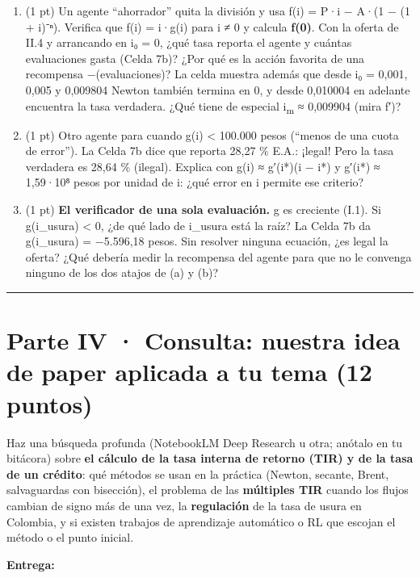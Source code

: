 \begin{enumerate}
\def\labelenumi{\alph{enumi})}
\item
  (1 pt) Un agente ``ahorrador'' quita la división y usa f(i) = P·i − A·(1 − (1 + i)⁻ⁿ). Verifica que f(i) = i·g(i) para i ≠ 0 y calcula \textbf{f(0)}. Con la oferta de II.4 y arrancando en i₀ = 0, ¿qué tasa reporta el agente y cuántas evaluaciones gasta (Celda 7b)? ¿Por qué es la acción favorita de una recompensa −(evaluaciones)? La celda muestra además que desde i₀ = 0,001, 0,005 y 0,009804 Newton también termina en 0, y desde 0,010004 en adelante encuentra la tasa verdadera. ¿Qué tiene de especial i\textsubscript{m} ≈ 0,009904 (mira f′)?
\item
  (1 pt) Otro agente para cuando \textbar g(i)\textbar{} \textless{} 100.000 pesos (``menos de una cuota de error''). La Celda 7b dice que reporta 28,27 \% E.A.: ¡legal! Pero la tasa verdadera es 28,64 \% (ilegal). Explica con g(i) ≈ g′(i*)(i − i*) y g′(i*) ≈ 1,59·10⁸ pesos por unidad de i: ¿qué error en i permite ese criterio?
\item
  (1 pt) \textbf{El verificador de una sola evaluación.} g es creciente (I.1). Si g(i\_usura) \textless{} 0, ¿de qué lado de i\_usura está la raíz? La Celda 7b da g(i\_usura) = −5.596,18 pesos. Sin resolver ninguna ecuación, ¿es legal la oferta? ¿Qué debería medir la recompensa del agente para que no le convenga ninguno de los dos atajos de (a) y (b)?
\end{enumerate}

\begin{center}\rule{0.5\linewidth}{0.5pt}\end{center}

\section{Parte IV · Consulta: nuestra idea de paper aplicada a tu tema (12 puntos)}

Haz una búsqueda profunda (NotebookLM Deep Research u otra; anótalo en tu bitácora) sobre \textbf{el cálculo de la tasa interna de retorno (TIR) y de la tasa de un crédito}: qué métodos se usan en la práctica (Newton, secante, Brent, salvaguardas con bisección), el problema de las \textbf{múltiples TIR} cuando los flujos cambian de signo más de una vez, la \textbf{regulación} de la tasa de usura en Colombia, y si existen trabajos de aprendizaje automático o RL que escojan el método o el punto inicial.

\textbf{Entrega:}

